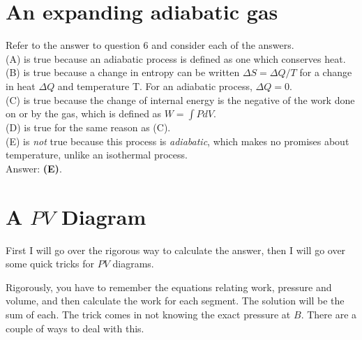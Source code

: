 \documentclass[11pt]{paper}
\newcommand{\answer}[1]{Answer: \textbf{(#1)}.}
\begin{document}
\section{An expanding adiabatic gas}
Refer to the answer to question 6 and consider each of the answers.\\
(A) is true because an adiabatic process is defined as one which conserves heat.\\
(B) is true because a change in entropy can be written $\Delta S = \Delta Q/T$ for a change in heat $\Delta Q$ and temperature T.  For an adiabatic process, $\Delta Q = 0$.\\
(C) is true because the change of internal energy is the negative of the work done on or by the gas, which is defined as $W = \int P dV$.\\
(D) is true for the same reason as (C).\\
(E) is \emph{not} true because this process is \emph{adiabatic}, which makes no promises about temperature, unlike an isothermal process.\\

\answer{E}

\section{A $PV$ Diagram}
First I will go over the rigorous way to calculate the answer, then I will go over some quick tricks for $PV$ diagrams.

Rigorously, you have to remember the equations relating work, pressure and volume, and then calculate the work for each segment.  The solution will be the sum of each.  The trick comes in not knowing the exact pressure at $B$.  There are a couple of ways to deal with this.
\end{document}
